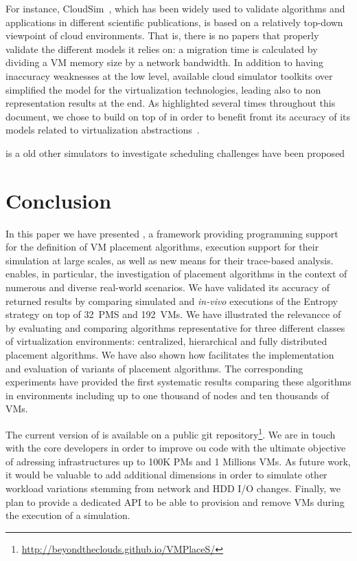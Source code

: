 For instance, CloudSim~\cite{cloudsim}, which has been widely used to
validate algorithms and applications in different scientific
publications, is based on a relatively top-down viewpoint of cloud
environments.  That is, there is no papers that properly validate the
different models it relies on: a migration time is calculated by
dividing a VM memory size by a network bandwidth.
 In addition to having inaccuracy weaknesses at the low level, available cloud
simulator toolkits over simplified the model for the virtualization
technologies, leading also to non representation results at the
end. As highlighted several times throughout this document, we chose to
build \vmps on top of \sg in order to benefit fromt its accuracy of
its models related to virtualization abstractions~\cite{Hirofuchi:2013:ALM:2568486.2568524}.


 is a old other simulators to investigate
scheduling challenges have been proposed

\section{Conclusion}
\label{sec:conclusion}
In this paper we have presented
\vmps, a framework providing programming support for the definition of
VM placement algorithms, execution support for their simulation at
large scales, as well as new means for their trace-based analysis.
\vmps enables, in particular, the investigation of placement
algorithms in the context of numerous and diverse real-world
scenarios. We have validated its accuracy of returned results by
comparing simulated and \textit{in-vivo} executions of the Entropy
strategy on top of 32~PMS and 192~VMs. We have illustrated the
relevancce of \vmps by evaluating and comparing algorithms
representative for three different classes of virtualization
environments: centralized, hierarchical and fully distributed
placement algorithms. We have also shown how \vmps facilitates the
implementation and evaluation of variants of placement algorithms. The
corresponding experiments have provided the first systematic results
comparing these algorithms in environments including up to one
thousand of nodes and ten thousands of VMs.

The current version of \vmps is available on a public git
repository\footnote{\url{http://beyondtheclouds.github.io/VMPlaceS/}}.
We are in touch with the \sg core developers in order to improve ou
code with the ultimate objective of adressing infrastructures up to
100K PMs and 1 Millions VMs. As future work, it would be valuable to add
additional dimensions in order to simulate other workload variations
stemming from network and HDD I/O changes. Finally,
we plan to provide a dedicated API to be able to
provision and remove VMs during the execution of a simulation.

